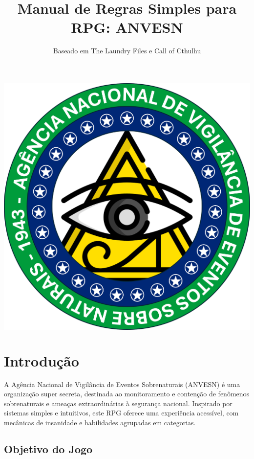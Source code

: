 \documentclass[a4paper,12pt]{book}
\title{Manual de Regras Simples para RPG: ANVESN}
\author{Baseado em The Laundry Files e Call of Cthulhu}
\date{}
\begin{document}
\maketitle

\begin{center}
\newpage
\vspace*{\fill}
\includegraphics[scale=.9]{imagens/ANVESN_LOGO.png}
\vspace*{\fill}
\newpage
\end{center}


\tableofcontents

\chapter{Introdução}

A Agência Nacional de Vigilância de Eventos Sobrenaturais (ANVESN) é uma organização super secreta, destinada ao monitoramento e contenção de fenômenos sobrenaturais e ameaças extraordinárias à segurança nacional. Inspirado por sistemas simples e intuitivos, este RPG oferece uma experiência acessível, com mecânicas de insanidade e habilidades agrupadas em categorias.

\section{Objetivo do Jogo}
\end{document}
